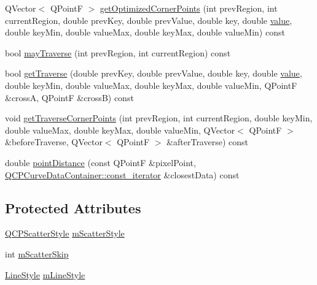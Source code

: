 \begin{DoxyCompactItemize}
\item 
Q\+Vector$<$ Q\+PointF $>$ \mbox{\hyperlink{class_q_c_p_curve_a66bff7933dac149c4577ad63a27da924}{get\+Optimized\+Corner\+Points}} (int prev\+Region, int current\+Region, double prev\+Key, double prev\+Value, double key, double \mbox{\hyperlink{diffusion_8cpp_a4b41795815d9f3d03abfc739e666d5da}{value}}, double key\+Min, double value\+Max, double key\+Max, double value\+Min) const
\item 
bool \mbox{\hyperlink{class_q_c_p_curve_af5df2560b30333fe662ec676bd355415}{may\+Traverse}} (int prev\+Region, int current\+Region) const
\item 
bool \mbox{\hyperlink{class_q_c_p_curve_afc5367ef0369d7a88ebba6eacf55f14f}{get\+Traverse}} (double prev\+Key, double prev\+Value, double key, double \mbox{\hyperlink{diffusion_8cpp_a4b41795815d9f3d03abfc739e666d5da}{value}}, double key\+Min, double value\+Max, double key\+Max, double value\+Min, Q\+PointF \&crossA, Q\+PointF \&crossB) const
\item 
void \mbox{\hyperlink{class_q_c_p_curve_a55e24387fd97a2cad0def8a40809e9ec}{get\+Traverse\+Corner\+Points}} (int prev\+Region, int current\+Region, double key\+Min, double value\+Max, double key\+Max, double value\+Min, Q\+Vector$<$ Q\+PointF $>$ \&before\+Traverse, Q\+Vector$<$ Q\+PointF $>$ \&after\+Traverse) const
\item 
double \mbox{\hyperlink{class_q_c_p_curve_aa2c9c9c0e57f11f18a5cb7e47927157c}{point\+Distance}} (const Q\+PointF \&pixel\+Point, \mbox{\hyperlink{class_q_c_p_data_container_ae40a91f5cb0bcac61d727427449b7d15}{Q\+C\+P\+Curve\+Data\+Container\+::const\+\_\+iterator}} \&closest\+Data) const
\end{DoxyCompactItemize}
\subsection*{Protected Attributes}
\begin{DoxyCompactItemize}
\item 
\mbox{\hyperlink{class_q_c_p_scatter_style}{Q\+C\+P\+Scatter\+Style}} \mbox{\hyperlink{class_q_c_p_curve_a08f803b4a30b01bbd7a1eab15d0f864f}{m\+Scatter\+Style}}
\item 
int \mbox{\hyperlink{class_q_c_p_curve_a990bd5fdeb474459f3f6f5ad0a7b945c}{m\+Scatter\+Skip}}
\item 
\mbox{\hyperlink{class_q_c_p_curve_a2710e9f79302152cff794c6e16cc01f1}{Line\+Style}} \mbox{\hyperlink{class_q_c_p_curve_ae1f35ae2b15aee8e15bcdfec5be95156}{m\+Line\+Style}}
\end{DoxyCompactItemize}
